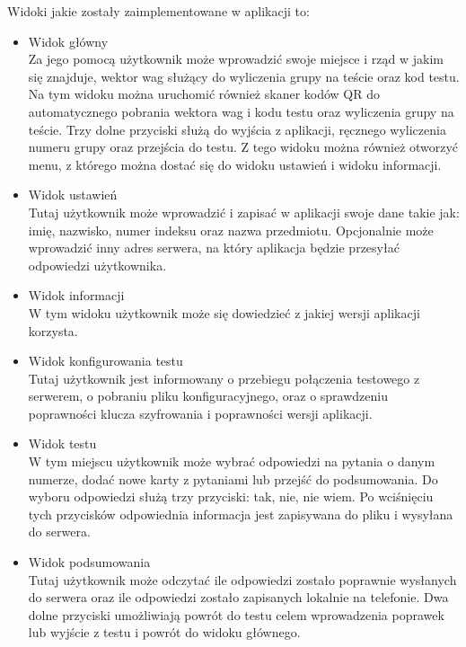 \documentclass{report}
\begin{document}
		Widoki jakie zostały zaimplementowane w aplikacji to:
		\begin{itemize}
			\item Widok główny\\
			Za jego pomocą użytkownik może wprowadzić swoje miejsce i rząd w jakim się znajduje, wektor wag służący do wyliczenia grupy na teście oraz kod testu. Na tym widoku można uruchomić również skaner kodów QR do automatycznego pobrania wektora wag i kodu testu oraz wyliczenia grupy na teście. Trzy dolne przyciski służą do wyjścia z aplikacji, ręcznego wyliczenia numeru grupy oraz przejścia do testu. Z tego widoku można również otworzyć menu, z którego można dostać się do widoku ustawień i widoku informacji.
			
			\item Widok ustawień\\
			Tutaj użytkownik może wprowadzić i zapisać w aplikacji swoje dane takie jak: imię, nazwisko, numer indeksu oraz nazwa przedmiotu. Opcjonalnie może wprowadzić inny adres serwera, na który aplikacja będzie przesyłać odpowiedzi użytkownika.
			
			\item Widok informacji\\
			W tym widoku użytkownik może się dowiedzieć z jakiej wersji aplikacji korzysta.
			
			\item Widok konfigurowania testu\\
			Tutaj użytkownik jest informowany o przebiegu połączenia testowego z serwerem, o pobraniu pliku konfiguracyjnego, oraz o sprawdzeniu poprawności klucza szyfrowania i poprawności wersji aplikacji.
			
			\item Widok testu\\
			W tym miejscu użytkownik może wybrać odpowiedzi na pytania o danym numerze, dodać nowe karty z pytaniami lub przejść do podsumowania. Do wyboru odpowiedzi służą trzy przyciski: tak, nie, nie wiem. Po wciśnięciu tych przycisków odpowiednia informacja jest zapisywana do pliku i wysyłana do serwera.
			
			\item Widok podsumowania\\
			Tutaj użytkownik może odczytać ile odpowiedzi zostało poprawnie wysłanych do serwera oraz ile odpowiedzi zostało zapisanych lokalnie na telefonie. Dwa dolne przyciski umożliwiają powrót do testu celem wprowadzenia poprawek lub wyjście z testu i powrót do widoku głównego.
			
		\end{itemize}
		
\end{document}
